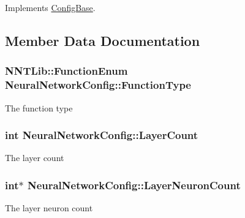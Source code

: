 Implements \hyperlink{class_config_base}{Config\+Base}.



\subsection{Member Data Documentation}
\hypertarget{class_neural_network_config_a41262125abc80afb0e32470468a7afb0}{}
\subsubsection[{Function\+Type}]{\setlength{\rightskip}{0pt plus 5cm}N\+N\+T\+Lib\+::\+Function\+Enum Neural\+Network\+Config\+::\+Function\+Type}\label{class_neural_network_config_a41262125abc80afb0e32470468a7afb0}


The function type 

\hypertarget{class_neural_network_config_a1bbbe016a258c2ac3fb52e1e4873ca38}{}
\subsubsection[{Layer\+Count}]{\setlength{\rightskip}{0pt plus 5cm}int Neural\+Network\+Config\+::\+Layer\+Count}\label{class_neural_network_config_a1bbbe016a258c2ac3fb52e1e4873ca38}


The layer count 

\hypertarget{class_neural_network_config_a86a494523f269a122a439144c9e6cb89}{}
\subsubsection[{Layer\+Neuron\+Count}]{\setlength{\rightskip}{0pt plus 5cm}int$\ast$ Neural\+Network\+Config\+::\+Layer\+Neuron\+Count}\label{class_neural_network_config_a86a494523f269a122a439144c9e6cb89}


The layer neuron count 

\hypertarget{class_neural_network_config_ac387c49af177bd1c2d122fdab2250ea3}{}
